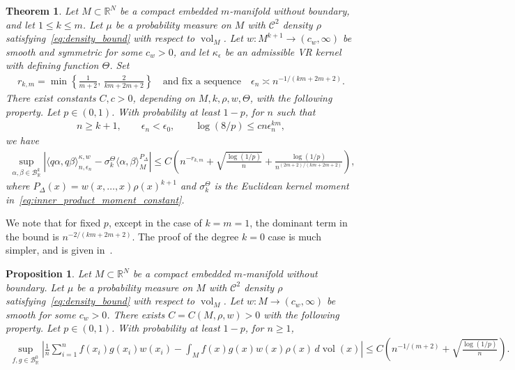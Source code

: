 \documentclass[11pt,reqno]{amsproc}
\numberwithin{equation}{section}
\newcommand{\R}{\mathbb{R}}
\newcommand{\cB}{\mathcal{B}}
\newcommand{\cC}{\mathcal{C}}
\newcommand{\vol}{\operatorname{vol}}
\newcommand{\dvol}{d\!\vol}
\newtheorem{proposition}[counter]{Proposition}
\newtheorem{theorem}[counter]{Theorem}
\theoremstyle{definition}
\theoremstyle{plain}
\begin{document}
    \begin{theorem} \label{thm:main_uc}
        Let $M\subset\R^N$ be a compact embedded $m$-manifold without boundary, and let $1\leq k\leq m$. Let $\mu$ be a probability measure on $M$ with $\cC^2$ density $\rho$ satisfying~\eqref{eq:density_bound} with respect to $\vol_M$. Let $w:M^{k+1}\to(c_w,\infty)$ be smooth and symmetric for some $c_w>0$, and let $\kappa_\epsilon$ be an admissible VR kernel with defining function $\Theta$. Set
        \begin{align}
        r_{k,m} = \min \left\{ \frac{1}{m+2}, \, \frac{2}{km+2m+2}\right\}
        \quad \text{and fix a sequence} \quad 
        \epsilon_n\asymp n^{-1/(km+2m+2)}.
        \end{align}
        There exist constants $C, c > 0$, depending on $M, k, \rho, w, \Theta$, with the following property. Let $p \in (0,1)$. With probability at least $1 - p$, for $n$ such that
        \begin{align}
            n\geq k+1,\qquad \epsilon_n<\epsilon_0,
            \qquad
            \log(8/p)\leq cn\epsilon_n^{km},
        \end{align}
        we have
        \begin{align}
            \sup_{\alpha, \beta \in \cB_\R^k} |\langle q\alpha, q\beta\rangle^{\kappa,w}_{n, \epsilon_n} - \sigma^\Theta_k \langle \alpha, \beta \rangle_M^{P_\Delta}| \leq C\left(n^{-r_{k,m}} + \sqrt{\frac{\log(1/p)}{n}} + \frac{\log(1/p)}{n^{(2m+2)/(km+2m+2)}}\right),
        \end{align}
        where $P_\Delta(x)=w(x,\ldots,x)\rho(x)^{k+1}$ and $\sigma^\Theta_k$ is the Euclidean kernel moment in~\eqref{eq:inner_product_moment_constant}. 
    \end{theorem}

    We note that for fixed $p$, except in the case of $k=m=1$, the dominant term in the bound is $n^{-2/(km+2m+2)}$. 
    The proof of the degree $k=0$ case is much simpler, and is given in~.

    \begin{proposition}\label{prop:main_uc_degree_zero}
        Let $M\subset\R^N$ be a compact embedded $m$-manifold without boundary. Let $\mu$ be a probability measure on $M$ with $\cC^2$ density $\rho$ satisfying~\eqref{eq:density_bound} with respect to $\vol_M$. Let $w:M\to(c_w,\infty)$ be smooth for some $c_w>0$. There exists $C = C(M, \rho, w) > 0$ with the following property. Let $p\in(0,1)$. With probability at least $1-p$, for $n\geq1$,
        \begin{align}
            \sup_{f,g\in\cB_\R^0}
            \left|
            \frac1n\sum_{i=1}^n f(x_i)g(x_i)w(x_i)
            -\int_M f(x)g(x)w(x)\rho(x)\,\dvol(x)
            \right|
            \leq C\left(
            n^{-1/(m+2)}+\sqrt{\frac{\log(1/p)}{n}}
            \right).
        \end{align}
    \end{proposition}
\end{document}
